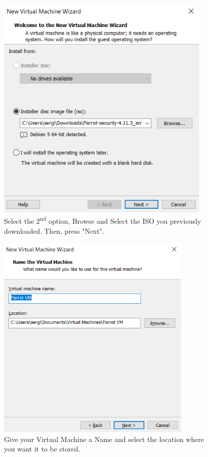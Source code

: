 \documentclass[a4paper]{article}
\begin{document}
    \vfill

    \begin{figure}[h!]
        \centering
        \includegraphics[height=11cm, keepaspectratio]{Images/Create_VM/Creating_VM_2.png}
        \caption{Select the 2\textsuperscript{nd} option, Browse and Select the ISO you previously downloaded. Then, press "Next".}
    \end{figure}

    \clearpage

    \begin{figure}[h]
        \centering
        \includegraphics[height=10cm, keepaspectratio]{Images/Create_VM/Creating_VM_3.png}
        \caption{Give your Virtual Machine a Name and select the location where you want it to be stored.}
    \end{figure}
\end{document}
